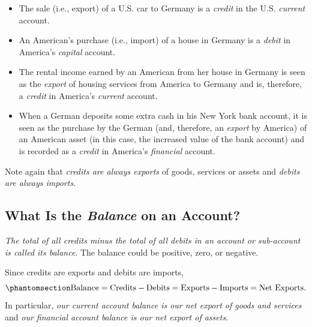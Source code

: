 \documentclass[
  letterpaper,
]{book}
\providecommand{\tightlist}{%
  \setlength{\itemsep}{0pt}\setlength{\parskip}{0pt}}\usepackage{longtable,booktabs,array}
\theoremstyle{plain}
\theoremstyle{remark}
\begin{document}
\begin{itemize}
\tightlist
\item
  The sale (i.e., export) of a U.S. car to Germany is a \emph{credit} in
  the U.S. \emph{current} account.
\item
  An American's purchase (i.e., import) of a house in Germany is a
  \emph{debit} in America's \emph{capital} account.
\item
  The rental income earned by an American from her house in Germany is
  seen as the \emph{export} of housing services from America to Germany
  and is, therefore, a \emph{credit} in America's \emph{current}
  account.
\item
  When a German deposits some extra cash in his New York bank account,
  it is seen as the purchase by the German (and, therefore, an
  \emph{export} by America) of an American asset (in this case, the
  increased value of the bank account) and is recorded as a
  \emph{credit} in America's \emph{financial} account.
\end{itemize}

Note again that \emph{credits are always exports} of goods, services or
assets and \emph{debits are always imports}.

\subsection{\texorpdfstring{What Is the \emph{Balance} on an
Account?}{What Is the Balance on an Account?}}\label{sec-balance}

\emph{The total of all credits minus the total of all debits in an
account or sub-account is called its
balance}. The balance could be
positive, zero, or negative.

Since credits are exports and debits are imports,
\begin{equation}\phantomsection\label{eq-balancedef}{
\text{Balance} = \text{Credits} - \text{Debits} = \text{Exports} - \text{Imports} = \text{Net Exports}.
}\end{equation} In particular, \emph{our current account balance is our
net export of goods and services} and \emph{our financial account
balance is our net export of assets}.
\end{document}
